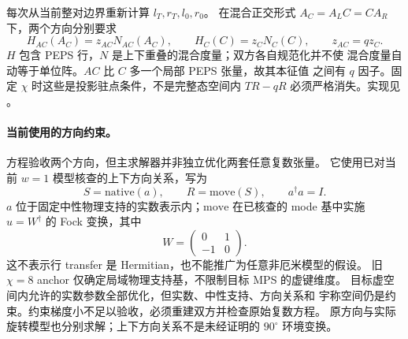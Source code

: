 每次从当前整对边界重新计算 $l_T,r_T,l_0,r_0$。
在混合正交形式 $A_C=A_LC=CA_R$ 下，两个方向分别要求
\begin{equation}
 H_{AC}(A_C)=z_{AC}N_{AC}(A_C),\qquad
 H_C(C)=z_CN_C(C),\qquad z_{AC}=qz_C.
\end{equation}
$H$ 包含 PEPS 行，$N$ 是上下重叠的混合度量；双方各自规范化并不使
混合度量自动等于单位阵。$AC$ 比 $C$ 多一个局部 PEPS 张量，故其本征值
之间有 $q$ 因子。固定 $\chi$ 时这些是投影驻点条件，不是完整态空间内
$TR-qR$ 必须严格消失。实现见
。

\paragraph{当前使用的方向约束。}
方程验收两个方向，但主求解器并非独立优化两套任意复数张量。
它使用已对当前 $w=1$ 模型核查的上下方向关系，写为
\begin{equation}
 S=\mathrm{native}(a),\qquad R=\mathrm{move}(S),\qquad a^\dagger a=I.
\end{equation}
$a$ 位于固定中性物理支持的实数表示内；$\mathrm{move}$ 在已核查的
mode 基中实施 $u=W^\dagger$ 的 Fock 变换，其中
\begin{equation}
 W=\begin{pmatrix}0&1\\-1&0\end{pmatrix}.
\end{equation}
这不表示行 transfer 是 Hermitian，也不能推广为任意非厄米模型的假设。
旧 $\chi=8$ anchor 仅确定局域物理支持基，不限制目标 MPS 的虚键维度。
目标虚空间内允许的实数参数全部优化，但实数、中性支持、方向关系和
宇称空间仍是约束。约束梯度小不足以验收，必须重建双方并检查原始复数方程。
原方向与实际旋转模型也分别求解；上下方向关系不是未经证明的 $90^\circ$
环境变换。

